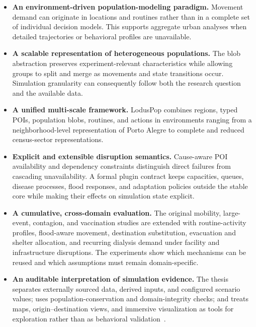 \begin{itemize}
    \item \textbf{An environment-driven population-modeling paradigm.} Movement demand can originate in locations and routines rather than in a complete set of individual decision models. This supports aggregate urban analyses when detailed trajectories or behavioral profiles are unavailable.

    \item \textbf{A scalable representation of heterogeneous populations.} The blob abstraction preserves experiment-relevant characteristics while allowing groups to split and merge as movements and state transitions occur. Simulation granularity can consequently follow both the research question and the available data.

    \item \textbf{A unified multi-scale framework.} LodusPop combines regions, typed POIs, population blobs, routines, and actions in environments ranging from a neighborhood-level representation of Porto Alegre to complete and reduced census-sector representations.

    \item \textbf{Explicit and extensible disruption semantics.} Cause-aware POI availability and dependency constraints distinguish direct failures from cascading unavailability. A formal plugin contract keeps capacities, queues, disease processes, flood responses, and adaptation policies outside the stable core while making their effects on simulation state explicit.

    \item \textbf{A cumulative, cross-domain evaluation.} The original mobility, large-event, contagion, and vaccination studies are extended with routine-activity profiles, flood-aware movement, destination substitution, evacuation and shelter allocation, and recurring dialysis demand under facility and infrastructure disruptions. The experiments show which mechanisms can be reused and which assumptions must remain domain-specific.

    \item \textbf{An auditable interpretation of simulation evidence.} The thesis separates externally sourced data, derived inputs, and configured scenario values; uses population-conservation and domain-integrity checks; and treats maps, origin--destination views, and immersive visualization as tools for exploration rather than as behavioral validation~\cite{teixeira2024visualization,silva2026geospatial}.
\end{itemize}

